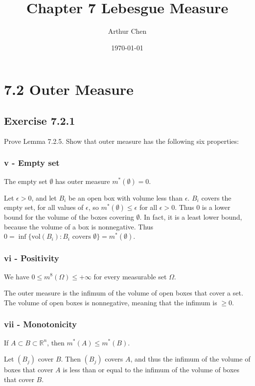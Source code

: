 \documentclass{article}
\author{Arthur Chen}
\title{Chapter 7 Lebesgue Measure}
\date{\today}
\newcommand{\R}{\mathbb{R}}
\newcommand{\vol}{\text{vol}}
\begin{document}
\maketitle

\section*{7.2 Outer Measure}

\subsection*{Exercise 7.2.1}

Prove Lemma 7.2.5. Show that outer measure has the following six properties:

\subsubsection*{v - Empty set}

The empty set $\emptyset$ has outer measure $m^*(\emptyset) = 0$.

Let $\epsilon > 0$, and let $B_i$ be an open box with volume less than $\epsilon$. $B_i$ covers the empty set, for all values of $\epsilon$, so $m^*(\emptyset) \leq \epsilon$ for all $\epsilon > 0$. Thus 0 is a lower bound for the volume of the boxes covering $\emptyset$. In fact, it is a least lower bound, because the volume of a box is nonnegative. Thus $0 = \inf\{\vol(B_i): B_i \text{ covers }\emptyset \} = m^*(\emptyset)$.

\subsubsection*{vi - Positivity}

We have $0 \leq m^8(\Omega) \leq + \infty$ for every measurable set $\Omega$.

The outer measure is the infimum of the volume of open boxes that cover a set. The volume of open boxes is nonnegative, meaning that the infimum is $\geq 0$.

\subsubsection*{vii - Monotonicity}

If $A \subset B \subset \R^n$, then $m^*(A) \leq m^*(B)$.

Let $(B_j)$ cover $B$. Then $(B_j)$ covers $A$, and thus the infimum of the volume of boxes that cover $A$ is less than or equal to the infimum of the volume of boxes that cover $B$.
\end{document}

